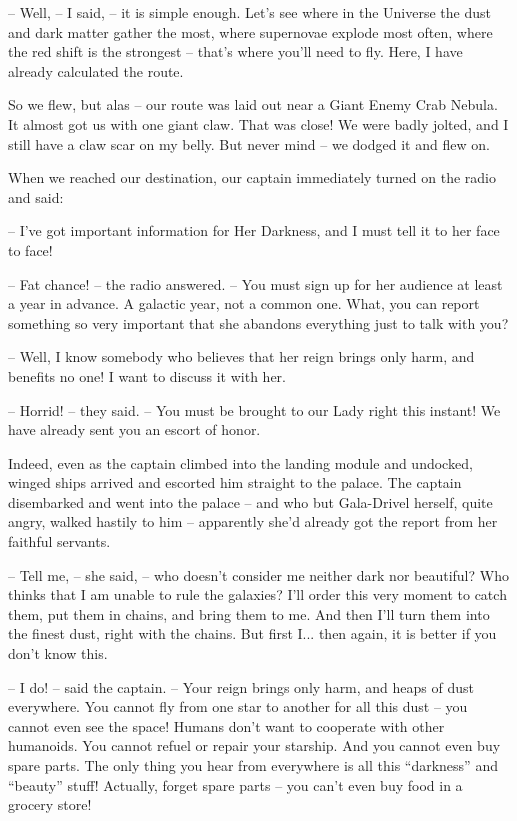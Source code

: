 \documentclass[ebook,oneside,final,openright]{memoir}
\begin{document}
– Well, – I said, – it is simple enough. Let’s see where in the Universe the dust and dark matter gather the most, where supernovae explode most often, where the red shift is the strongest – that’s where you’ll need to fly. Here, I have already calculated the route.\par
So we flew, but alas – our route was laid out near a Giant Enemy Crab Nebula. It almost got us with one giant claw. That was close! We were badly jolted, and I still have a claw scar on my belly. But never mind – we dodged it and flew on. \par
\par
When we reached our destination, our captain immediately turned on the radio and said:\par
– I’ve got important information for Her Darkness, and I must tell it to her face to face!\par
– Fat chance! – the radio answered. – You must sign up for her audience at least a year in advance. A galactic year, not a common one. What, you can report something so very important that she abandons everything just to talk with you?\par
– Well, I know somebody who believes that her reign brings only harm, and benefits no one! I want to discuss it with her.\par
– Horrid! – they said. – You must be brought to our Lady right this instant! We have already sent you an escort of honor.\par
\par
Indeed, even as the captain climbed into the landing module and undocked, winged ships arrived and escorted him straight to the palace. The captain disembarked and went into the palace – and who but Gala-Drivel herself, quite angry, walked hastily to him – apparently she’d already got the report from her faithful servants.\par
– Tell me, – she said, – who doesn’t consider me neither dark nor beautiful? Who thinks that I am unable to rule the galaxies? I’ll order this very moment to catch them, put them in chains, and bring them to me. And then I’ll turn them into the finest dust, right with the chains. But first I... then again, it is better if you don’t know this.\par
– I do! – said the captain. – Your reign brings only harm, and heaps of dust everywhere. You cannot fly from one star to another for all this dust – you cannot even see the space! Humans don’t want to cooperate with other humanoids. You cannot refuel or repair your starship. And you cannot even buy spare parts. The only thing you hear from everywhere is all this “darkness” and “beauty” stuff! Actually, forget spare parts – you can’t even buy food in a grocery store!\par
\end{document}

